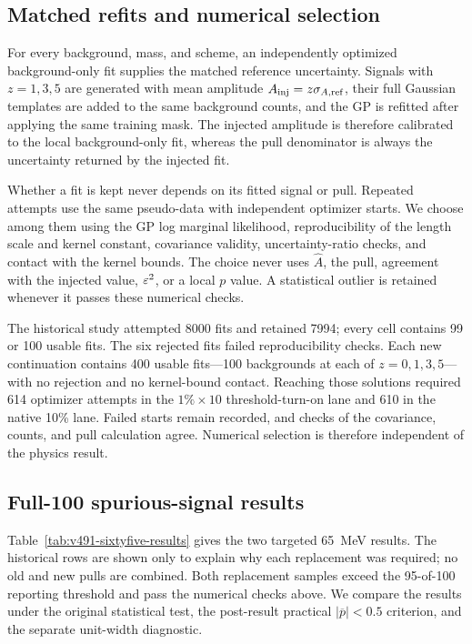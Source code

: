 \subsection{Matched refits and numerical selection}

For every background, mass, and scheme, an independently optimized background-only
fit supplies the matched reference uncertainty.  Signals with
$z=1,3,5$ are generated with mean amplitude
$A_{\rm inj}=z\sigma_{A,{\rm ref}}$, their full Gaussian templates are added to the
same background counts, and the GP is refitted after applying the same training mask.
The injected amplitude is therefore calibrated to the local background-only fit,
whereas the pull denominator is always the uncertainty returned by the injected fit.

Whether a fit is kept never depends on its fitted signal or pull.  Repeated attempts
use the same pseudo-data with independent optimizer starts.  We choose among them using
the GP log marginal likelihood, reproducibility of the length scale and kernel
constant, covariance validity, uncertainty-ratio checks, and contact with the kernel
bounds.  The choice never uses $\widehat A$, the pull, agreement with the injected
value, $\varepsilon^2$, or a local $p$ value.  A statistical outlier is retained whenever it
passes these numerical checks.

The historical study attempted 8000 fits and retained 7994; every cell contains 99 or
100 usable fits.  The six rejected fits failed reproducibility checks.  Each new
continuation contains 400 usable fits---100 backgrounds at each of $z=0,1,3,5$---with
no rejection and no kernel-bound contact.  Reaching those solutions required 614
optimizer attempts in the $1\%\times10$ threshold-turn-on lane and 610 in the native
10\% lane.  Failed starts remain recorded, and checks of the covariance, counts, and
pull calculation agree.  Numerical selection is therefore independent of the physics
result.

\subsection{Full-100 spurious-signal results}
\label{sec:v491-spurious-signal}

Table~\ref{tab:v491-sixtyfive-results} gives the two targeted 65~MeV results.  The
historical rows are shown only to explain why each replacement was required; no old
and new pulls are combined.  Both replacement samples exceed the 95-of-100 reporting
threshold and pass the numerical checks above.  We compare the results under the
original statistical test, the post-result practical
$|\overline p|<0.5$ criterion, and the separate unit-width diagnostic.

